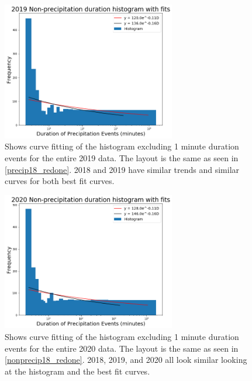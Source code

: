 \documentclass[11pt]{report}
\begin{document}
\clearpage

\begin{figure}[t]
	\centering
	\includegraphics[width=0.675\textwidth]{Figures/nonprecip_2019_new.png}
	\caption[2019 Non-precipitation duration Exponentials with contrasting curve fitting]
	{\label{nonprecip19_redone}
		Shows curve fitting of the histogram excluding 1 minute duration events for the entire 2019 data. The layout is the same as seen in \ref{precip18_redone}. 2018 and 2019 have similar trends and similar curves for both best fit curves.  }
\end{figure}
\begin{figure}[b]
	\centering
	\includegraphics[width=0.675\textwidth]{Figures/nonprecip_2020_new.png}
	\caption[2020 Non-precipitation duration Exponentials with contrasting curve fitting]
	{\label{nonprecip20_redone}
		Shows curve fitting of the histogram excluding 1 minute duration events for the entire 2020 data. The layout is the same as seen in \ref{nonprecip18_redone}. 2018, 2019, and 2020 all look similar looking at the histogram and the best fit curves.   }
\end{figure}
\clearpage
\end{document}
